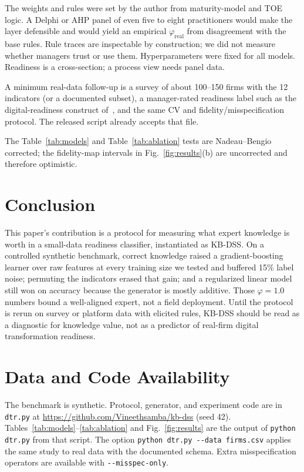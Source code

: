 \documentclass[10pt,journal,compsoc]{IEEEtran}
\begin{document}
The weights and rules were set by the author from maturity-model and TOE logic. A Delphi or AHP panel of even five to eight practitioners would make the layer defensible and would yield an empirical \(\varphi_{\mathrm{real}}\) from disagreement with the base rules. Rule traces are inspectable by construction; we did not measure whether managers trust or use them. Hyperparameters were fixed for all models. Readiness is a cross-section; a process view needs panel data.

A minimum real-data follow-up is a survey of about 100--150 firms with the 12 indicators (or a documented subset), a manager-rated readiness label such as the digital-readiness construct of~\cite{pingali2023}, and the same CV and fidelity/misspecification protocol. The released script already accepts that file.

The Table~\ref{tab:models} and Table~\ref{tab:ablation} tests are Nadeau--Bengio corrected; the fidelity-map intervals in Fig.~\ref{fig:results}(b) are uncorrected and therefore optimistic.

\section{Conclusion}

This paper's contribution is a protocol for measuring what expert knowledge is worth in a small-data readiness classifier, instantiated as KB-DSS. On a controlled synthetic benchmark, correct knowledge raised a gradient-boosting learner over raw features at every training size we tested and buffered 15\% label noise; permuting the indicators erased that gain; and a regularized linear model still won on accuracy because the generator is mostly additive. Those \(\varphi=1.0\) numbers bound a well-aligned expert, not a field deployment. Until the protocol is rerun on survey or platform data with elicited rules, KB-DSS should be read as a diagnostic for knowledge value, not as a predictor of real-firm digital transformation readiness.

\section*{Data and Code Availability}

The benchmark is synthetic. Protocol, generator, and experiment code are in \texttt{dtr.py} at \url{https://github.com/Vineethsamba/kb-dss} (seed 42). Tables~\ref{tab:models}--\ref{tab:ablation} and Fig.~\ref{fig:results} are the output of \texttt{python dtr.py} from that script. The option \verb|python dtr.py --data firms.csv| applies the same study to real data with the documented schema. Extra misspecification operators are available with \verb|--misspec-only|.
\end{document}
